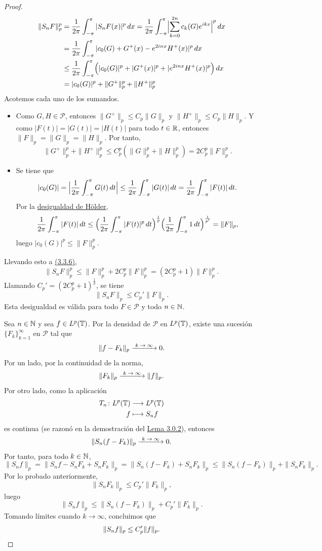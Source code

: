 \documentclass[a4paper, 12pt, oneside]{book}
\begin{document}
\begin{proof}
    \begin{equation}\label{3.3.6}
    \begin{aligned}[b]
        \|S_nF\|_p^p &= \frac{1}{2\pi}\integral[x]{-\pi}{\pi}{|S_nF(x)|^p} = \frac{1}{2\pi}\integral[x]{-\pi}{\pi}{\Bigl|\sum_{k=0}^{2n}c_k(G)e^{ikx}\Bigr|^p} \\ 
        &=\frac{1}{2\pi}\integral[x]{-\pi}{\pi}{|c_0(G)+G^+(x)-e^{2inx}H^+(x)|^p} \\
        &\leq \frac{1}{2\pi}\integral[x]{-\pi}{\pi}{\Bigl(|c_0(G)|^p+|G^+(x)|^p+|e^{2inx}H^+(x)|^p\Bigr)} \\
        &= |c_0(G)|^p + \|G^+\|_p^p + \|H^+\|_p^p
    \end{aligned}
    \end{equation}
    Acotemos cada uno de los sumandos.
    \begin{itemize}
        \item Como $G,H \in \mathcal{P}$, entonces $\|G^+\|_p \leq C_p \|G\|_p$ y $\|H^+\|_p \leq C_p\|H\|_p$. Y como $|F(t)| = |G(t)| = |H(t)|$ para todo $t \in \R$, entonces $\|F\|_p=\|G\|_p=\|H\|_p$. Por tanto,
        \[\|G^+\|_p^p + \|H^+\|_p^p \leq C_p^p(\|G\|_p^p+\|H\|_p^p) = 2C_p^p\|F\|_p^p.\]
        \item Se tiene que
        \[|c_0(G)| = \Bigl|\frac{1}{2\pi}\integral{-\pi}{\pi}{G(t)}\Bigr| \leq \frac{1}{2\pi}\integral{-\pi}{\pi}{|G(t)|} = \frac{1}{2\pi}\integral{-\pi}{\pi}{|F(t)|}.\]
        Por la \hyperref[1.1.1]{\color{blue}desigualdad de Hölder},
        \[\frac{1}{2\pi}\integral{-\pi}{\pi}{|F(t)|} \leq \Bigl(\frac{1}{2\pi}\integral{-\pi}{\pi}{|F(t)|^p}\Bigr)^{\frac{1}{p}}\Bigl(\frac{1}{2\pi}\integral{-\pi}{\pi}{1}\Bigr)^{\frac{1}{p'}} = \|F\|_p,\]
        luego $|c_0(G)|^p \leq \|F\|_p^p$.
    \end{itemize}
    Llevando esto a \hyperref[3.3.6]{\color{blue}(3.3.6)},
    \[\|S_nF\|_p^p \leq \|F\|_p^p + 2C_p^p\|F\|_p^p = (2C_p^p+1)\|F\|_p^p.\]
    Llamando $C_p' = (2C_p^p+1)^{\frac{1}{p}}$, se tiene
    \[\|S_nF\|_p \leq C_p'\|F\|_p.\]
    Esta desigualdad es válida para todo $F \in \mathcal{P}$ y todo $n \in \N$.

    Sea $n \in \N$ y sea $f \in L^p(\T)$. Por la densidad de $\mathcal{P}$ en $L^p(\T)$, existe una sucesión $\{F_k\}_{k=1}^\infty$ en $\mathcal{P}$ tal que
    \[\|f-F_k\|_p \kconv 0.\]
    Por un lado, por la continuidad de la norma,
    \[\|F_k\|_p \kconv \|f\|_p.\]
    Por otro lado, como la aplicación
    \begin{align*}
        T_n \colon L^p(\T) &\longrightarrow L^p(\T) \\
        f &\longmapsto S_nf
    \end{align*}
    es continua (se razonó en la demostración del \hyperref[3.0.2]{\color{blue}Lema 3.0.2}), entonces 
    \[\|S_n(f-F_k)\|_p \kconv 0.\]
    Por tanto, para todo $k \in \N$,
    \[\|S_nf\|_p = \|S_nf-S_nF_k+S_nF_k\|_p = \|S_n(f-F_k)+S_nF_k\|_p  \leq \|S_n(f-F_k)\|_p + \|S_nF_k\|_p.\]
    Por lo probado anteriormente,
    \[\|S_nF_k\|_p \leq C_p'\|F_k\|_p,\]
    luego
    \[\|S_nf\|_p  \leq \|S_n(f-F_k)\|_p + C_p'\|F_k\|_p.\]
    Tomando límites cuando $k \to\infty$, concluimos que
    \[\|S_nf\|_p \leq C_p'\|f\|_p. \qedhere\]
\end{proof}
\end{document}
